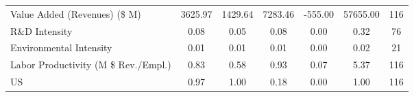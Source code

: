 {\begin{tabular}{l*{1}{cccccc}}
Value Added (Revenues) (\$ M)&     3625.97&     1429.64&     7283.46&     -555.00&    57655.00&         116\\
R\&D Intensity      &        0.08&        0.05&        0.08&        0.00&        0.32&          76\\
Environmental Intensity&        0.01&        0.01&        0.01&        0.00&        0.02&          21\\
Labor Productivity (M \$ Rev./Empl.)&        0.83&        0.58&        0.93&        0.07&        5.37&         116\\
US                  &        0.97&        1.00&        0.18&        0.00&        1.00&         116\\
\hline\hline
\end{tabular}
}

